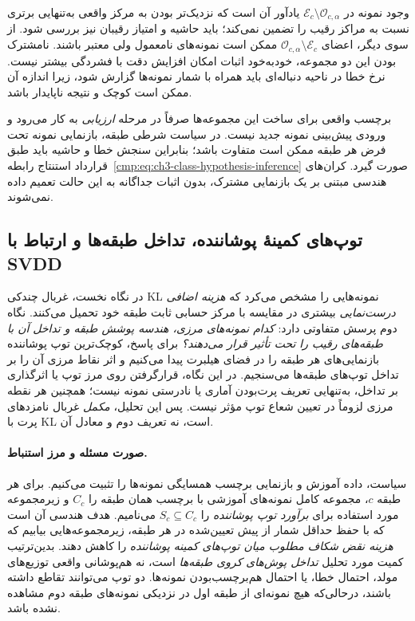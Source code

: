 وجود نمونه در
$\mathcal E_c\setminus\mathcal O_{c,\alpha}$
یادآور آن است که نزدیک‌تر بودن به مرکز واقعی
به‌تنهایی برتری نسبت به مراکز رقیب را تضمین نمی‌کند؛
باید حاشیه و امتیاز رقیبان نیز بررسی شود.
از سوی دیگر، اعضای
$\mathcal O_{c,\alpha}\setminus\mathcal E_c$
ممکن است نمونه‌های نامعمول ولی معتبر باشند.
نامشترک بودن این دو مجموعه، خودبه‌خود
اثبات امکان افزایش دقت با فشردگی بیشتر نیست.
نرخ خطا در ناحیه دنباله‌ای باید همراه با
شمار نمونه‌ها گزارش شود، زیرا اندازه آن
ممکن است کوچک و نتیجه ناپایدار باشد.

برچسب واقعی برای ساخت این مجموعه‌ها
صرفاً در مرحله \emph{ارزیابی} به کار می‌رود
و ورودی پیش‌بینی نمونه جدید نیست.
در سیاست شرطی طبقه، بازنمایی نمونه تحت
فرض هر طبقه ممکن است متفاوت باشد؛
بنابراین سنجش خطا و حاشیه باید طبق قرارداد
استنتاج رابطه~\eqref{cmp:eq:ch3-class-hypothesis-inference}
صورت گیرد. کران‌های هندسی مبتنی بر
یک بازنمایی مشترک، بدون اثبات جداگانه
به این حالت تعمیم داده نمی‌شوند.


\subsection{توپ‌های کمینهٔ پوشاننده، تداخل طبقه‌ها و ارتباط با SVDD}
\label{cmp:subsec:ch3-outlier-js-enclosing-balls}
در نگاه نخست، غربال چندکی KL
نمونه‌هایی را مشخص می‌کرد که
\emph{هزینه اضافی درست‌نمایی}
بیشتری در مقایسه با مرکز حسابی
ثابت طبقه خود تحمیل می‌کنند.
نگاه دوم پرسش متفاوتی دارد:
\emph{کدام نمونه‌های مرزی، هندسه
پوشش طبقه و تداخل آن با
طبقه‌های رقیب را تحت تأثیر
قرار می‌دهند؟}
برای پاسخ، کوچک‌ترین توپ
پوشاننده بازنمایی‌های هر طبقه
را در فضای هیلبرت پیدا می‌کنیم
و اثر نقاط مرزی آن را بر
تداخل توپ‌های طبقه‌ها می‌سنجیم.
در این نگاه، قرارگرفتن روی
مرز توپ یا اثرگذاری بر تداخل،
به‌تنهایی تعریف پرت‌بودن
آماری یا نادرستی نمونه نیست؛
همچنین هر نقطه مرزی لزوماً
در تعیین شعاع توپ مؤثر نیست.
پس این تحلیل، \emph{مکمل}
غربال نامزدهای پرت با KL است،
نه تعریف دوم و معادل آن.

\paragraph{صورت مسئله و مرز استنباط.}
سیاست، داده آموزش و بازنمایی
برچسب همسایگی نمونه‌ها را
تثبیت می‌کنیم. برای هر طبقه
$c$، مجموعه کامل نمونه‌های
آموزشی با برچسب همان طبقه را
$C_c$ و زیرمجموعه مورد استفاده
برای \emph{برآورد توپ پوشاننده}
را $S_c\subseteq C_c$ می‌نامیم.
هدف هندسی آن است که با حفظ
حداقل شمار از پیش تعیین‌شده
در هر طبقه، زیرمجموعه‌هایی
بیابیم که \emph{هزینه نقض شکاف
مطلوب میان توپ‌های کمینه
پوشاننده} را کاهش دهند.
بدین‌ترتیب کمیت مورد تحلیل
\emph{تداخل پوش‌های کروی طبقه‌ها}
است، نه هم‌پوشانی واقعی
توزیع‌های مولد، احتمال خطا،
یا احتمال هم‌برچسب‌بودن
نمونه‌ها. دو توپ می‌توانند
تقاطع داشته باشند، درحالی‌که
هیچ نمونه‌ای از طبقه اول
در نزدیکی نمونه‌های طبقه
دوم مشاهده نشده باشد.

